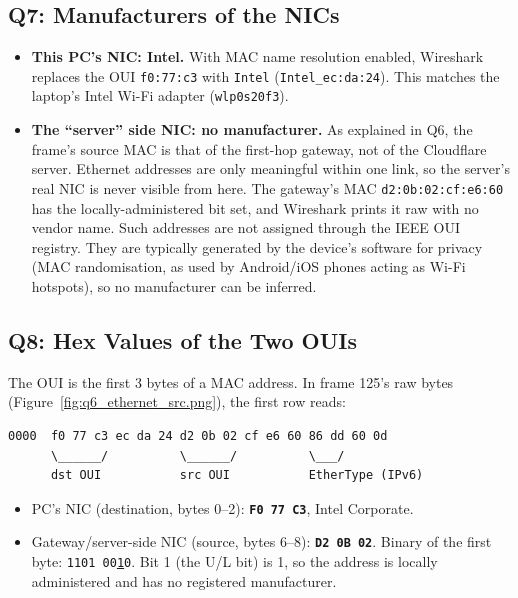\documentclass[11pt]{article}
\begin{document}
\subsection{Q7: Manufacturers of the NICs}
\begin{itemize}[leftmargin=1.6em]
  \item \textbf{This PC's NIC: Intel.} With MAC name resolution enabled, Wireshark
  replaces the OUI \texttt{f0:77:c3} with \texttt{Intel} (\texttt{Intel\_ec:da:24}). This
  matches the laptop's Intel Wi-Fi adapter (\texttt{wlp0s20f3}).
  \item \textbf{The ``server'' side NIC: no manufacturer.} As explained in Q6, the frame's
  source MAC is that of the first-hop gateway, not of the Cloudflare server. Ethernet
  addresses are only meaningful within one link, so the server's real NIC is never visible
  from here. The gateway's MAC \texttt{d2:0b:02:cf:e6:60} has the locally-administered bit
  set, and Wireshark prints it raw with no vendor name. Such addresses are not assigned
  through the IEEE OUI registry. They are typically generated by the device's software for
  privacy (MAC randomisation, as used by Android/iOS phones acting as Wi-Fi hotspots), so no
  manufacturer can be inferred.
\end{itemize}

\subsection{Q8: Hex Values of the Two OUIs}
The OUI is the first 3 bytes of a MAC address. In frame 125's raw bytes
(Figure~\ref{fig:q6_ethernet_src.png}), the first row reads:
\begin{lstlisting}[columns=fixed,keepspaces=true]
0000  f0 77 c3 ec da 24 d2 0b 02 cf e6 60 86 dd 60 0d
      \______/          \______/          \___/
      dst OUI           src OUI           EtherType (IPv6)
\end{lstlisting}
\begin{itemize}[leftmargin=1.6em]
  \item PC's NIC (destination, bytes 0--2): \textbf{\texttt{F0 77 C3}}, Intel Corporate.
  \item Gateway/server-side NIC (source, bytes 6--8): \textbf{\texttt{D2 0B 02}}. Binary of
  the first byte: \texttt{1101 00\underline{1}0}. Bit 1 (the U/L bit) is 1, so the address
  is locally administered and has no registered manufacturer.
\end{itemize}
\end{document}
